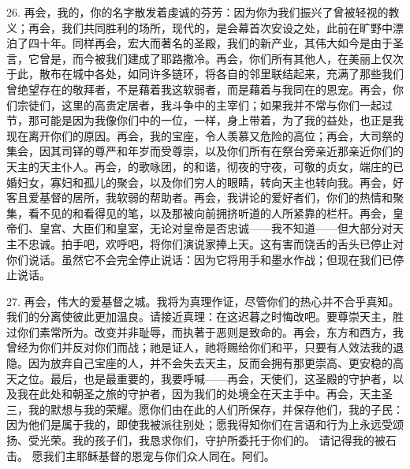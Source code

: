 26. 再会，我的，你的名字散发着虔诚的芬芳：因为你为我们振兴了曾被轻视的教义；再会，我们共同胜利的场所，现代的，是会幕首次安设之处，此前在旷野中漂泊了四十年。同样再会，宏大而著名的圣殿，我们的新产业，其伟大如今是由于圣言，它曾是，而今被我们建成了耶路撒冷。再会，你们所有其他人，在美丽上仅次于此，散布在城中各处，如同许多链环，将各自的邻里联结起来，充满了那些我们曾绝望存在的敬拜者，不是藉着我这软弱者，而是藉着与我同在的恩宠。再会，你们宗徒们，这里的高贵定居者，我斗争中的主宰们；如果我并不常与你们一起过节，那可能是因为我像你们中的一位，一样，身上带着，为了我的益处，也正是我现在离开你们的原因。再会，我的宝座，令人羡慕又危险的高位；再会，大司祭的集会，因其司铎的尊严和年岁而受尊崇，以及你们所有在祭台旁亲近那亲近你们的天主的天主仆人。再会，的歌咏团，的和谐，彻夜的守夜，可敬的贞女，端庄的已婚妇女，寡妇和孤儿的聚会，以及你们穷人的眼睛，转向天主也转向我。再会，好客且爱基督的居所，我软弱的帮助者。再会，我讲论的爱好者们，你们的热情和聚集，看不见的和看得见的笔，以及那被向前拥挤听道的人所紧靠的栏杆。再会，皇帝们、皇宫、大臣们和皇室，无论对皇帝是否忠诚——我不知道——但大部分对天主不忠诚。拍手吧，欢呼吧，将你们演说家捧上天。这有害而饶舌的舌头已停止对你们说话。虽然它不会完全停止说话：因为它将用手和墨水作战；但现在我们已停止说话。\par

27. 再会，伟大的爱基督之城。我将为真理作证，尽管你们的热心并不合乎真知。 我们的分离使彼此更加温良。请接近真理：在这迟暮之时悔改吧。要尊崇天主，胜过你们素常所为。改变并非耻辱，而执著于恶则是致命的。再会，东方和西方，我曾经为你们并反对你们而战；祂是证人，祂将赐给你们和平，只要有人效法我的退隐。因为放弃自己宝座的人，并不会失去天主，反而会拥有那更崇高、更安稳的高天之位。最后，也是最重要的，我要呼喊——再会，天使们，这圣殿的守护者，以及我在此处和朝圣之旅的守护者，因为我们的处境全在天主手中。再会，天主圣三，我的默想与我的荣耀。愿你们由在此的人们所保存，并保存他们，我的子民：因为他们是属于我的，即使我被派往别处；愿我得知你们在言语和行为上永远受颂扬、受光荣。我的孩子们，我恳求你们，守护所委托于你们的。 请记得我的被石击。 愿我们主耶稣基督的恩宠与你们众人同在。阿们。\par


